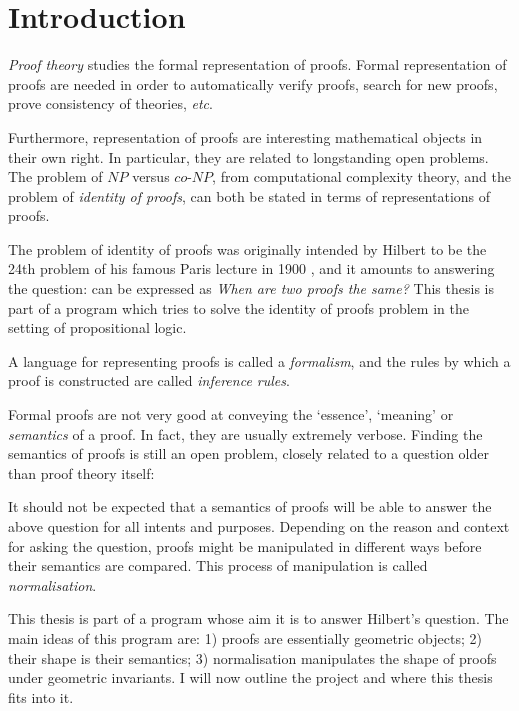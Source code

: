 \chapter{Introduction}

\emph{Proof theory} studies the formal representation of proofs. Formal representation of proofs are needed in order to automatically verify proofs, search for new proofs, prove consistency of theories, \emph{etc}.

Furthermore, representation of proofs are interesting mathematical objects in their own right. In particular, they are related to longstanding open problems. The problem of $NP$ versus $co$-$NP$, from computational complexity theory, and the problem of \emph{identity of proofs}, can both be stated in terms of representations of proofs.

The problem of identity of proofs was originally intended by Hilbert to be the 24th problem of his famous Paris lecture in 1900 \cite{Thie:03:Hilberts:yu}, and it amounts to answering the question: can be expressed as \emph{When are two proofs the same?} This thesis is part of a program which tries to solve the identity of proofs problem in the setting of propositional logic.

A language for representing proofs is called a \emph{formalism}, and the rules by which a proof is constructed are called \emph{inference rules}.

Formal proofs are not very good at conveying the `essence', `meaning' or \emph{semantics} of a proof. In fact, they are usually extremely verbose. Finding the semantics of proofs is still an open problem, closely related to a question older than proof theory itself:

It should not be expected that a semantics of proofs will be able to answer the above question for all intents and purposes. Depending on the reason and context for asking the question, proofs might be manipulated in different ways before their semantics are compared. This process of manipulation is called \emph{normalisation}.


This thesis is part of a program whose aim it is to answer Hilbert's question. The main ideas of this program are: 1) proofs are essentially geometric objects; 2) their shape is their semantics; 3) normalisation manipulates the shape of proofs under geometric invariants. I will now outline the project and where this thesis fits into it.

